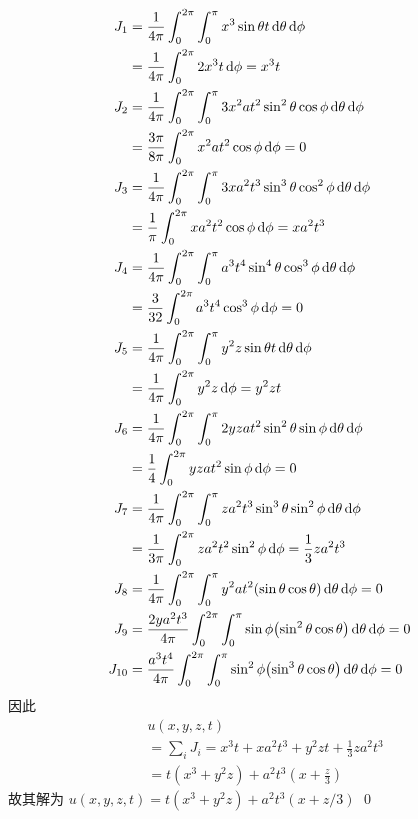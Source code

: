 \begin{solution}
\begin{align*}
J_1 &= \frac{1}{4\pi} \int_0^{2\pi} \int_0^\pi
        x^3 \sin\theta t \diff\theta \diff\phi \\
    &= \frac{1}{4\pi} \int_0^{2\pi} 2x^3t \diff\phi = x^3t \\
J_2 &= \frac{1}{4\pi} \int_0^{2\pi} \int_0^\pi
        3x^2 at^2\sin^2\theta \cos\phi \diff\theta \diff\phi \\
    &= \frac{3\pi}{8\pi} \int_0^{2\pi} x^2at^2 \cos\phi \diff\phi = 0 \\
J_3 &= \frac{1}{4\pi} \int_0^{2\pi} \int_0^\pi
        3x a^2t^3\sin^3\theta \cos^2\phi \diff\theta \diff\phi \\
    &= \frac{1}{\pi} \int_0^{2\pi} xa^2t^2 \cos\phi \diff\phi = xa^2t^3 \\
J_4 &= \frac{1}{4\pi} \int_0^{2\pi} \int_0^\pi
        a^3t^4\sin^4\theta \cos^3\phi \diff\theta \diff\phi \\
    &= \frac{3}{32} \int_0^{2\pi} a^3t^4 \cos^3\phi \diff\phi = 0 \\
J_5 &= \frac{1}{4\pi} \int_0^{2\pi} \int_0^\pi
        y^2z \sin\theta t \diff\theta \diff\phi \\
    &= \frac{1}{4\pi} \int_0^{2\pi} y^2z \diff\phi = y^2zt \\
J_6 &= \frac{1}{4\pi} \int_0^{2\pi} \int_0^\pi
        2yzat^2\sin^2\theta \sin\phi \diff\theta \diff\phi \\
    &= \frac{1}{4} \int_0^{2\pi} yzat^2 \sin\phi \diff\phi = 0 \\
J_7 &= \frac{1}{4\pi} \int_0^{2\pi} \int_0^\pi
        za^2t^3\sin^3\theta \sin^2\phi \diff\theta \diff\phi \\
    &= \frac{1}{3\pi} \int_0^{2\pi} za^2t^2 \sin^2\phi \diff\phi
	    = \frac13za^2t^3 \\
J_8 &= \frac{1}{4\pi} \int_0^{2\pi} \int_0^\pi
        y^2at^2\mclosure{\sin\theta\cos\theta} \diff\theta \diff\phi = 0 \\
J_9 &= \frac{2ya^2t^3}{4\pi} \int_0^{2\pi} \int_0^\pi \sin\phi
        \mclosure{\sin^2\theta \cos\theta} \diff\theta \diff\phi = 0 \\
J_{10} &= \frac{a^3t^4}{4\pi} \int_0^{2\pi} \int_0^\pi \sin^2\phi
        \mclosure{\sin^3\theta \cos\theta} \diff\theta \diff\phi = 0
\end{align*}
因此
\begin{align*}
&u(x, y, z, t) \\
&= \sum_i J_i = x^3t + xa^2t^3 + y^2zt + \frac13za^2t^3 \\
&= t(x^3 + y^2z) + a^2t^3(x + \frac{z}{3})
\end{align*}
故其解为 $u(x, y, z, t) = t(x^3 + y^2z) + a^2t^3(x + z/3)$
\qed
\end{solution}

